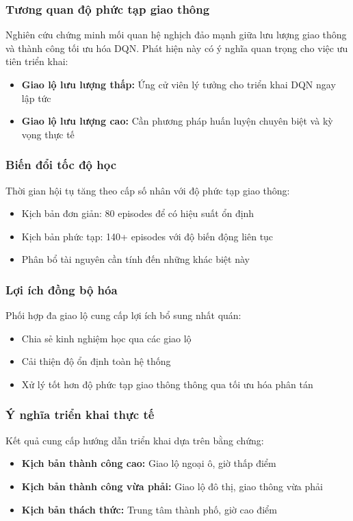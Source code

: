 \subsubsection{Tương quan độ phức tạp giao thông}
Nghiên cứu chứng minh mối quan hệ nghịch đảo mạnh giữa lưu lượng giao thông và
thành công tối ưu hóa DQN. Phát hiện này có ý nghĩa quan trọng cho việc ưu tiên triển khai:
\begin{itemize}
    \item \textbf{Giao lộ lưu lượng thấp:} Ứng cử viên lý tưởng cho triển khai DQN ngay lập tức
    \item \textbf{Giao lộ lưu lượng cao:} Cần phương pháp huấn luyện chuyên biệt và kỳ vọng thực tế
\end{itemize}

\subsubsection{Biến đổi tốc độ học}
Thời gian hội tụ tăng theo cấp số nhân với độ phức tạp giao thông:
\begin{itemize}
    \item Kịch bản đơn giản: 80 episodes để có hiệu suất ổn định
    \item Kịch bản phức tạp: 140+ episodes với độ biến động liên tục
    \item Phân bổ tài nguyên cần tính đến những khác biệt này
\end{itemize}

\subsubsection{Lợi ích đồng bộ hóa}
Phối hợp đa giao lộ cung cấp lợi ích bổ sung nhất quán:
\begin{itemize}
    \item Chia sẻ kinh nghiệm học qua các giao lộ
    \item Cải thiện độ ổn định toàn hệ thống
    \item Xử lý tốt hơn độ phức tạp giao thông thông qua tối ưu hóa phân tán
\end{itemize}

\subsubsection{Ý nghĩa triển khai thực tế}
Kết quả cung cấp hướng dẫn triển khai dựa trên bằng chứng:
\begin{itemize}
    \item \textbf{Kịch bản thành công cao:} Giao lộ ngoại ô, giờ thấp điểm
    \item \textbf{Kịch bản thành công vừa phải:} Giao lộ đô thị, giao thông vừa phải
    \item \textbf{Kịch bản thách thức:} Trung tâm thành phố, giờ cao điểm
\end{itemize}


